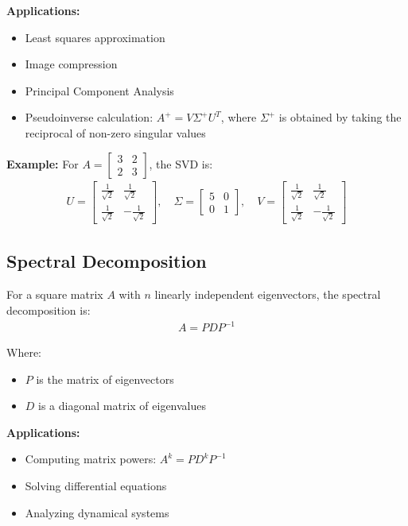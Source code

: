 \documentclass{article}
\begin{document}
\textbf{Applications:}
\begin{itemize}
    \item Least squares approximation
    \item Image compression
    \item Principal Component Analysis
    \item Pseudoinverse calculation: $A^+ = V\Sigma^+U^T$, where $\Sigma^+$ is obtained by taking the reciprocal of non-zero singular values
\end{itemize}

\textbf{Example:}
For $A = \begin{bmatrix} 3 & 2 \\ 2 & 3 \end{bmatrix}$, the SVD is:
\begin{align}
U = \begin{bmatrix} 
\frac{1}{\sqrt{2}} & \frac{1}{\sqrt{2}} \\
\frac{1}{\sqrt{2}} & -\frac{1}{\sqrt{2}}
\end{bmatrix}, \quad
\Sigma = \begin{bmatrix} 
5 & 0 \\
0 & 1
\end{bmatrix}, \quad
V = \begin{bmatrix} 
\frac{1}{\sqrt{2}} & \frac{1}{\sqrt{2}} \\
\frac{1}{\sqrt{2}} & -\frac{1}{\sqrt{2}}
\end{bmatrix}
\end{align}

\subsection{Spectral Decomposition}

For a square matrix $A$ with $n$ linearly independent eigenvectors, the spectral decomposition is:
\begin{align}
A = PDP^{-1}
\end{align}

Where:
\begin{itemize}
    \item $P$ is the matrix of eigenvectors
    \item $D$ is a diagonal matrix of eigenvalues
\end{itemize}

\textbf{Applications:}
\begin{itemize}
    \item Computing matrix powers: $A^k = PD^kP^{-1}$
    \item Solving differential equations
    \item Analyzing dynamical systems
\end{itemize}
\end{document}
